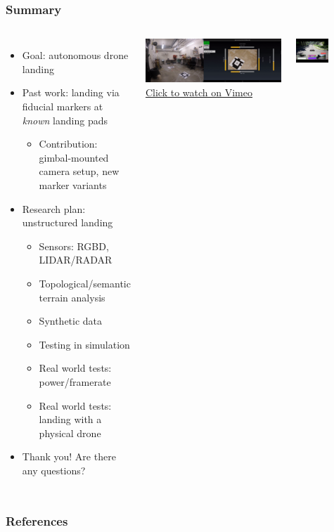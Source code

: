\documentclass[aspectratio=169]{rubeamer}
\newif\ifpause
\newcommand{\mypause}{\ifpause \pause \fi}
\begin{document}
\begin{frame}
  \frametitle{Summary}
  \begin{columns}
      \begin{itemize}
        \item Goal: autonomous drone landing
        \mypause
        \item Past work: landing via fiducial markers at \textit{known} landing pads
        \begin{itemize}
          \item Contribution: gimbal-mounted camera setup, new marker variants
        \end{itemize}
        \mypause
        \item Research plan: unstructured landing
        \begin{itemize}
          \mypause
          \item Sensors: RGBD, LIDAR/RADAR
          \mypause
          \item Topological/semantic terrain analysis
          \mypause
          \item Synthetic data
          \mypause
          \item Testing in simulation
          \mypause
          \item Real world tests: power/framerate
          \mypause
          \item Real world tests: landing with a physical drone
          \mypause
        \end{itemize}
        \item Thank you! Are there any questions?
      \end{itemize}

      \centering

      \onslide
      \includegraphics[width=\textwidth]{demo_screenshot}\\\href{https://vimeo.com/664863992}{\color{blue}Click to watch on Vimeo}\vspace{1cm}

      \includegraphics[width=0.5\textwidth]{airsim}
  \end{columns}
\end{frame}

\begin{frame}[allowframebreaks]
  \frametitle{References}
  \printbibliography{}
\end{frame}
\end{document}

